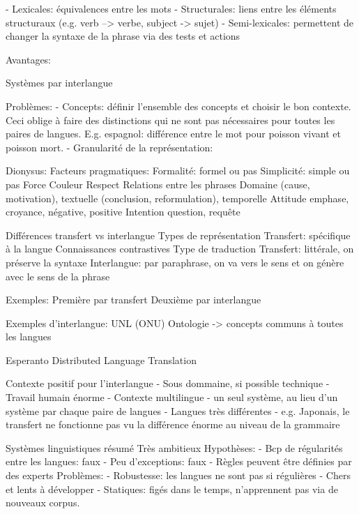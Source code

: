     - Lexicales: équivalences entre les mots
    - Structurales: liens entre les éléments structuraux (e.g. verb --> verbe, subject -> sujet)
    - Semi-lexicales: permettent de changer la syntaxe de la phrase via des tests et actions

Avantages:

Systèmes par interlangue

Problèmes:
    - Concepts: définir l'ensemble des concepts et choisir le bon contexte. Ceci oblige à faire des distinctions qui ne sont pas nécessaires pour toutes les paires de langues. E.g. espagnol: différence entre le mot pour poisson vivant et poisson mort.
    - Granularité de la représentation:

Dionysus:
    Facteurs pragmatiques:
        Formalité: formel ou pas
        Simplicité: simple ou pas
        Force
        Couleur
        Respect
    Relations entre les phrases
        Domaine (cause, motivation), textuelle (conclusion, reformulation), temporelle
    Attitude
        emphase, croyance, négative, positive
    Intention
        question, requête


Différences transfert vs interlangue
    Types de représentation
        Transfert: spécifique à la langue
    Connaissances contrastives
    Type de traduction
        Transfert: littérale, on préserve la syntaxe
        Interlangue: par paraphrase, on va vers le sens et on génère avec le sens de la phrase

Exemples:
    Première par transfert
    Deuxième par interlangue

Exemples d'interlangue:
    UNL (ONU)
    Ontologie -> concepts communs à toutes les langues

    Esperanto
    Distributed Language Translation


Contexte positif pour l'interlangue
    - Sous dommaine, si possible technique
        - Travail humain énorme
    - Contexte multilingue
        - un seul système, au lieu d'un système par chaque paire de langues
    - Langues très différentes
        - e.g. Japonais, le transfert ne fonctionne pas vu la différence énorme au niveau de la grammaire

Systèmes linguistiques résumé
    Très ambitieux
    Hypothèses:
        - Bcp de régularités entre les langues: faux
        - Peu d'exceptions: faux
        - Règles peuvent être définies par des experts
    Problèmes:
        - Robustesse: les langues ne sont pas si régulières
        - Chers et lents à développer
        - Statiques: figés dans le temps, n'apprennent pas via de nouveaux corpus.
